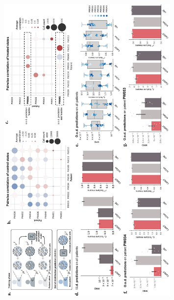 \newpage
\begin{figure}[H]
     \centering
     \includegraphics[width=0.8\textwidth]{figures/fig_gbm_patients_iid_ood.pdf}
\end{figure}
